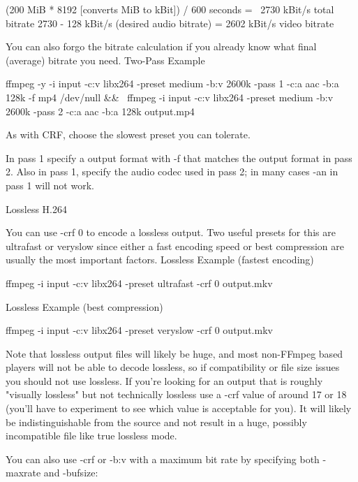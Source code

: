 \begin{itemize}
\begin{bash}
(200 MiB * 8192 [converts MiB to kBit]) / 600 seconds = ~2730 kBit/s total bitrate
2730 - 128 kBit/s (desired audio bitrate) = 2602 kBit/s video bitrate
\end{bash}

You can also forgo the bitrate calculation if you already know what final (average) bitrate you need.
Two-Pass Example

\begin{bash}
ffmpeg -y -i input -c:v libx264 -preset medium -b:v 2600k -pass 1 -c:a aac -b:a 128k -f mp4 /dev/null && \
ffmpeg -i input -c:v libx264 -preset medium -b:v 2600k -pass 2 -c:a aac -b:a 128k output.mp4
\end{bash}

As with CRF, choose the slowest preset you can tolerate.

In pass 1 specify a output format with -f that matches the output format in pass 2. Also in pass 1, specify the audio codec used in pass 2; in many cases -an in pass 1 will not work.


Lossless H.264

 You can use -crf 0 to encode a lossless output. Two useful presets for this are ultrafast or veryslow since either a fast encoding speed or best compression are usually the most important factors.
Lossless Example (fastest encoding)

\begin{bash}
ffmpeg -i input -c:v libx264 -preset ultrafast -crf 0 output.mkv
\end{bash}

Lossless Example (best compression)

\begin{bash}
ffmpeg -i input -c:v libx264 -preset veryslow -crf 0 output.mkv
\end{bash}

Note that lossless output files will likely be huge, and most non-FFmpeg based players will not be able to decode lossless, so if compatibility or file size issues you should not use lossless. If you're looking for an output that is roughly "visually lossless" but not technically lossless use a -crf value of around 17 or 18 (you'll have to experiment to see which value is acceptable for you). It will likely be indistinguishable from the source and not result in a huge, possibly incompatible file like true lossless mode. 

 You can also use -crf or -b:v with a maximum bit rate by specifying both -maxrate and -bufsize:


\end{itemize}
